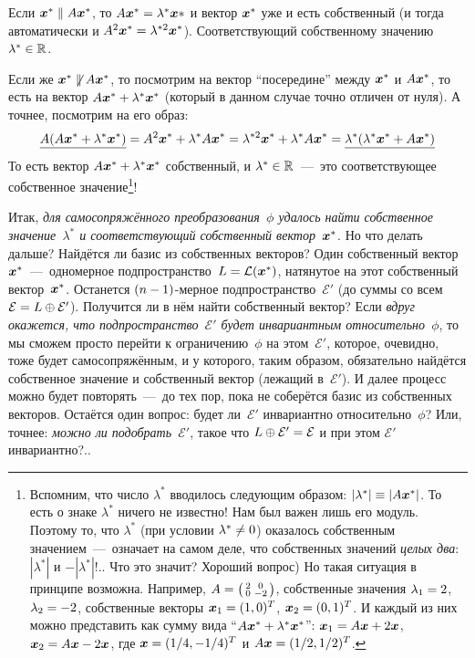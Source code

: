 \documentclass[a4paper,12pt]{article}
\theoremstyle{remark}
\begin{document}
  Если $\bds x^* \hm\parallel A \bds x^*$, то $A \bds x^* \hm= \lambda^* \bds x*$ и вектор $\boldsymbol x^*$ уже и есть собственный (и тогда автоматически и $A^2 \bds x^* \hm= \lambda^{*2} \bds x^*$).
  Соответствующий собственному значению~$\lambda^* \hm\in \RR$.
  
  Если же $\bds x^* \hm{\not\parallel} A \bds x^*$, то посмотрим на вектор ``посередине'' между $\boldsymbol x^*$ и $A \boldsymbol x^*$, то есть на вектор $A \bds x^* \hm+ \lambda^* \bds x^*$ (который в данном случае точно отличен от нуля).
  А точнее, посмотрим на его образ:
  \[
    \underline{A (A \boldsymbol x^* + \lambda^* \boldsymbol x^*)} = A^2 \boldsymbol x^* + \lambda^* A \boldsymbol x^* = \lambda^{*2} \boldsymbol x^* + \lambda^* A \boldsymbol x^* = \underline{\lambda^* (\lambda^* \boldsymbol x^* + A \boldsymbol x^*)}
  \]
  То есть вектор $A \bds x^* \hm+ \lambda^* \bds x^*$ собственный, и $\lambda^* \hm\in \RR$~---~это соответствующее собственное значение\footnote{Вспомним, что число $\lambda^*$ вводилось следующим образом: $|\lambda^*| \hm\equiv |A \bds x^*|$. То есть о знаке $\lambda^*$ ничего не известно! Нам был важен лишь его модуль. Поэтому то, что $\lambda^*$ (при условии $\lambda^* \hm{\not=} 0$) оказалось собственным значением~---~означает на самом деле, что собственных значений \emph{целых два}: $|\lambda^*|$ и $-|\lambda^*|$!.. Что это значит? Хороший вопрос) Но такая ситуация в принципе возможна. Например, $A \hm= \left(\begin{smallmatrix}2 & 0 \\ 0 & -2\end{smallmatrix}\right)$, собственные значения $\lambda_1 \hm= 2$, $\lambda_2 \hm= -2$, собственные векторы $\bds x_1 \hm= (1, 0)^T$, $\bds x_2 \hm= (0, 1)^T$. И каждый из них можно представить как сумму вида ``$A \bds x^* \hm+ \lambda^* \bds x^*$'': $\bds x_1 \hm= A \bds x \hm+ 2 \bds x$, $\bds x_2 \hm= A \bds x \hm- 2 \bds x$, где $\bds x \hm= (1/4, -1/4)^T$ и $A \bds x \hm= (1/2, 1/2)^T$.}!
  
  Итак, \emph{для самосопряжённого преобразования~$\phi$ удалось найти собственное значение~$\lambda^*$ и соответствующий собственный вектор~$\boldsymbol x^*$}.
  Но что делать дальше?
  Найдётся ли базис из собственных векторов?
  Один собственный вектор~$\boldsymbol x^*$~---~одномерное подпространство~$L \hm= \mathcal L(\bds x^*)$, натянутое на этот собственный вектор~$\boldsymbol x^*$.
  Останется $(n \hm- 1)$-мерное подпространство~$\mathcal E'$ (до суммы со всем~$\mathcal E \hm= L \hm\oplus \mathcal E'$).
  Получится ли в нём найти собственный вектор?
  Если \emph{вдруг окажется, что подпространство~$\mathcal E'$ будет инвариантным относительно~$\phi$}, то мы сможем просто перейти к ограничению~$\phi$ на этом~$\mathcal E'$, которое, очевидно, тоже будет самосопряжённым, и у которого, таким образом, обязательно найдётся собственное значение и собственный вектор (лежащий в~$\mathcal E'$).
  И далее процесс можно будет повторять~---~до тех пор, пока не соберётся базис из собственных векторов.
  Остаётся один вопрос: будет ли~$\mathcal E'$ инвариантно относительно~$\phi$?
  Или, точнее: \emph{можно ли подобрать~$\mathcal E'$}, такое что $L \hm\oplus \mathcal E' \hm= \mathcal E$ и при этом $\mathcal E'$ инвариантно?..
  
\end{document}
